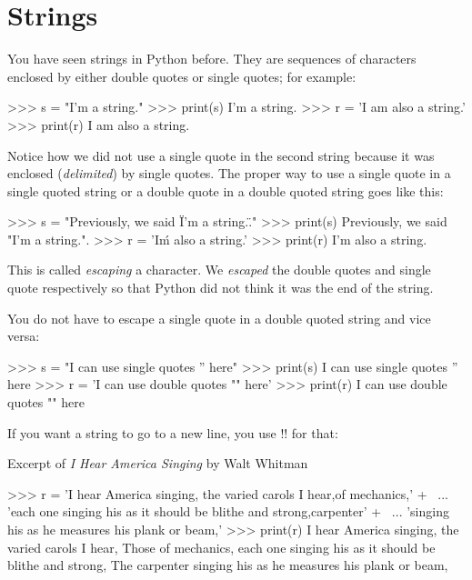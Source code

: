 \documentclass[11pt]{cselabheader}
\begin{document}
\pagebreak
\section{Strings}

You have seen strings in Python before. They are sequences of characters
enclosed by either double quotes or single quotes; for example:

\begin{pyconcode}
>>> s = "I'm a string."
>>> print(s)
I'm a string.
>>> r = 'I am also a string.'
>>> print(r)
I am also a string.
\end{pyconcode}

Notice how we did not use a single quote in the second string because it was
enclosed (\emph{delimited}) by single quotes. The proper way to use a single
quote in a single quoted string or a double quote in a double quoted string
goes like this:

\begin{pyconcode}
>>> s = "Previously, we said \"I'm a string.\"."
>>> print(s)
Previously, we said "I'm a string.".
>>> r = 'I\'m also a string.'
>>> print(r)
I'm also a string.
\end{pyconcode}

This is called \emph{escaping} a character. We \emph{escaped} the double quotes
and single quote respectively so that Python did not think it was the end of
the string.

You do not have to escape a single quote in a double quoted string and vice
versa:

\begin{pyconcode}
>>> s = "I can use single quotes '' here"
>>> print(s)
I can use single quotes '' here
>>> r = 'I can use double quotes "" here'
>>> print(r)
I can use double quotes "" here
\end{pyconcode}

If you want a string to go to a new line, you use \pythoninline!\n! for that:

\begin{listing}[H]
  \caption{Excerpt of \emph{I Hear America Singing} by Walt Whitman}
\begin{pyconcode}
>>> r = 'I hear America singing, the varied carols I hear,\nThose of mechanics,' + \
...     'each one singing his as it should be blithe and strong,\nThe carpenter' + \
...     'singing his as he measures his plank or beam,'
>>> print(r)
I hear America singing, the varied carols I hear,
Those of mechanics, each one singing his as it should be blithe and strong,
The carpenter singing his as he measures his plank or beam,
\end{pyconcode}
\end{listing}
\end{document}
